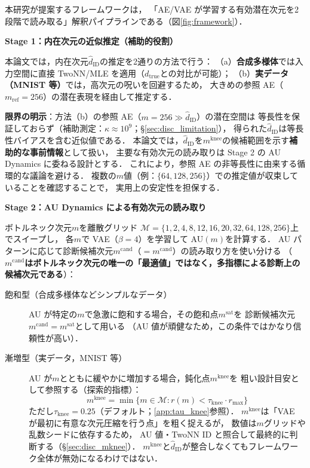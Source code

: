 \documentclass[11pt,a4paper]{jsarticle}
\newcommand{\dzopt}{m^{\mathrm{cand}}}
\newcommand{\dtrue}{d_{\mathrm{true}}}
\newcommand{\kap}{\kappa}
\newcommand{\dzsat}{m^{\mathrm{sat}}}
\newcommand{\mknee}{m^{\mathrm{knee}}}
\begin{document}
本研究が提案するフレームワークは，
「AE/VAE が学習する有効潜在次元を2段階で読み取る」解釈パイプラインである（図\ref{fig:framework}）．

\textbf{Stage 1：内在次元の近似推定（補助的役割）}

本論文では，内在次元$\hat{d}_\mathrm{ID}$の推定を2通りの方法で行う：
（a）\textbf{合成多様体}では入力空間に直接 TwoNN/MLE を適用（$\dtrue$との対比が可能）；
（b）\textbf{実データ（MNIST 等）}では，高次元の呪いを回避するため，
大きめの参照 AE（$m_{\mathrm{ref}} = 256$）の潜在表現を経由して推定する．

\textbf{限界の明示}：方法（b）の参照 AE（$m = 256 \gg \hat{d}_\mathrm{ID}$）の潜在空間は
等長性を保証しておらず（補助測定：$\kap \approx 10^9$；§\ref{sec:disc_limitation}），
得られた$\hat{d}_\mathrm{ID}$は等長性バイアスを含む近似値である．
本論文では，$\hat{d}_\mathrm{ID}$を$\mknee$の候補範囲を示す\textbf{補助的な事前情報}として扱い，
主要な有効次元の読み取りは Stage 2 の AU Dynamics に委ねる設計とする．
これにより，参照 AE の非等長性に由来する循環的な議論を避ける．
複数の$m$値（例：$\{64, 128, 256\}$）での推定値が収束していることを確認することで，
実用上の安定性を担保する．

\textbf{Stage 2：AU Dynamics による有効次元の読み取り}

ボトルネック次元$m$を離散グリッド
$\mathcal{M} = \{1, 2, 4, 8, 12, 16, 20, 32, 64, 128, 256\}$上でスイープし，
各$m$で VAE（$\beta = 4$）を学習して AU$(m)$を計算する．
AU パターンに応じて診断候補次元$\dzopt$（$= m^{\mathrm{cand}}$）の読み取り方を使い分ける
（\textbf{$\dzopt$はボトルネック次元の唯一の「最適値」ではなく，多指標による診断上の候補次元である}）：

\begin{description}
  \item[飽和型（合成多様体などシンプルなデータ）]
        AU が特定の$m$で急激に飽和する場合，その飽和点$\dzsat$を
        診断候補次元$\dzopt = \dzsat$として用いる
        （AU 値が頑健なため，この条件ではかなり信頼性が高い）．
  \item[漸増型（実データ，MNIST 等）]
        AU が$m$とともに緩やかに増加する場合，鈍化点$\mknee$を
        粗い設計目安として参照する（探索的指標）：
        \begin{equation}
          \mknee = \min\{m \in \mathcal{M} : r(m) < \tau_{\mathrm{knee}} \cdot r_{\max}\}
          \label{eq:mknee}
        \end{equation}
        ただし$\tau_{\mathrm{knee}} = 0.25$（デフォルト；\ref{app:tau_knee}参照）．
        $\mknee$は「VAE が最初に有意な次元圧縮を行う点」を粗く捉えるが，
        数値は$m$グリッドや乱数シードに依存するため，
        AU 値・TwoNN ID と照合して最終的に判断する（§\ref{sec:disc_mknee}）．
        $\mknee$と$\hat{d}_\mathrm{ID}$が整合しなくてもフレームワーク全体が無効になるわけではない．
\end{description}
\end{document}
